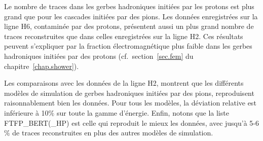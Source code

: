 Le nombre de traces dans les gerbes hadroniques initiées par les protons est plus grand que pour les cascades initiées par des pions. Les données enregistrées sur la ligne H6, contaminée par des protons, présentent aussi un plus grand nombre de traces reconstruites que dans celles enregistrées sur la ligne H2. Ces résultats peuvent s'expliquer par la fraction électromagnétique plus faible dans les gerbes hadroniques initiées par des protons (cf.~section~\ref{sec.fem} du chapitre~\ref{chap.shower}).

Les comparaisons avec les données de la ligne H2, montrent que les différents modèles de simulation de gerbes hadroniques initiées par des pions, reproduisent raisonnablement bien les données. Pour tous les modèles, la déviation relative est inférieure à 10$\%$ sur toute la gamme d'énergie. Enfin, notons que la liste FTFP\_BERT(\_HP) est celle qui reproduit le mieux les données, avec jusqu'à 5-6$\%$ de traces reconstruites en plus des autres modèles de simulation. 

